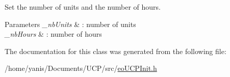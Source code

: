 \-Set the number of units and the number of hours. 


\begin{DoxyParams}{\-Parameters}
{\em \-\_\-nb\-Units} & \-: number of units \\
\hline
{\em \-\_\-nb\-Hours} & \-: number of hours \\
\hline
\end{DoxyParams}


\-The documentation for this class was generated from the following file\-:\begin{DoxyCompactItemize}
\item 
/home/yanis/\-Documents/\-U\-C\-P/src/\hyperlink{eo_u_c_p_init_8h}{eo\-U\-C\-P\-Init.\-h}\end{DoxyCompactItemize}
